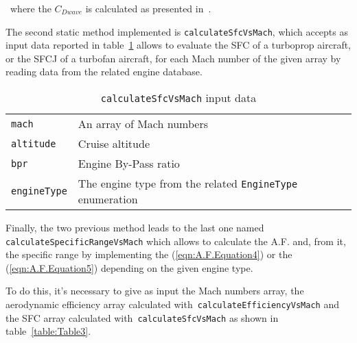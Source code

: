 \bigskip
\noindent
~where the $C_{Dwave}$ is calculated as presented in~\cite{hilton1951high}.

\bigskip
\noindent
The second static method implemented is \lstinline[language=Java]!calculateSfcVsMach!, which accepts as input data reported in table~\ref{table:Table2} allows to evaluate the SFC of a turboprop aircraft, or the SFCJ of a turbofan aircraft, for each Mach number of the given array by reading data from the related engine database.

\begin{table}[t]
\begin{tabular}{p{7cm}p{7.5cm}}
\toprule
\lstinline[language=Java]!mach!	& An array of Mach numbers \\[0.1cm]
\lstinline[language=Java]!altitude! & Cruise altitude \\[0.1cm]
\lstinline[language=Java]!bpr! & Engine By-Pass ratio \\[0.1cm]
\lstinline[language=Java]!engineType! & The engine type from the related \lstinline[language=Java]!EngineType! enumeration \\
\bottomrule
\end{tabular}
\caption{ \lstinline[language=Java]!calculateSfcVsMach! input data}
\label{table:Table2}
\end{table}

\bigskip
\noindent
Finally, the two previous method leads to the last one named \lstinline[language=Java]!calculateSpecificRangeVsMach! which allows to calculate the A.F. and, from it, the specific range by implementing the (\ref{eqn:A.F.Equation4}) or the (\ref{eqn:A.F.Equation5}) depending on the given engine type. 

To do this, it's necessary to give as input the Mach numbers array, the aerodynamic efficiency array calculated with~\lstinline[language=Java]!calculateEfficiencyVsMach! and the SFC array calculated with~\lstinline[language=Java]!calculateSfcVsMach! as shown in table~\ref{table:Table3}.

